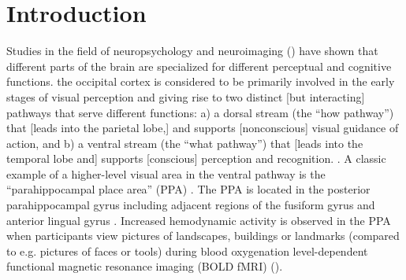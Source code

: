 \documentclass[english,11pt]{article}
\begin{document}

\pagebreak[4]



\section*{Introduction}



Studies in the field of neuropsychology and neuroimaging
(\citep[e.g.,][]{penfield1950cerebral, fox1984noninvasive}) have shown that
different parts of the brain are specialized for different perceptual and
cognitive functions.
the occipital cortex is considered to be primarily involved in the early stages
of visual perception and giving rise to two distinct [but interacting] pathways
that serve different functions:
a) a dorsal stream (the ``how pathway'') that [leads into the parietal lobe,]
and supports [nonconscious] visual guidance of action, and
b) a ventral stream (the ``what pathway'') that [leads into the temporal lobe
and] supports [conscious] perception and recognition.
\citep{goodale1992separate, milner2017two, mishkin1982contribution}.
A classic example of a higher-level visual area in the ventral pathway is the
``parahippocampal place area'' (PPA) \citep{epstein1998ppa,
epstein1999parahippocampal}.
The PPA is located in the posterior parahippocampal gyrus including adjacent
regions of the fusiform gyrus and anterior lingual gyrus
\citep{epstein2008parahippocampal}.
Increased hemodynamic activity is observed in the PPA when participants view
pictures of landscapes, buildings or landmarks (compared to e.g. pictures of
faces or tools) during blood oxygenation level-dependent functional magnetic
resonance imaging (BOLD fMRI) (\citep[see reviews][]{epstein2014neural,
aminoff2013role}).
\end{document}
